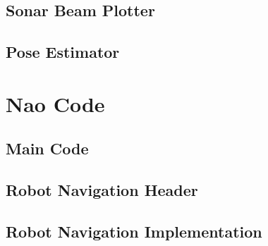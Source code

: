 \section{Sonar Beam Plotter}


\section{Pose Estimator}


\chapter{Nao Code}\label{chap:nao_code}

\section{Main Code}


\section{Robot Navigation Header}

\section{Robot Navigation Implementation}

